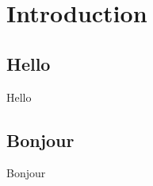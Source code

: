 \chapter{Introduction}\label{Chap1}
\minitoc

\section{Hello}\label{sec:hello}
Hello

\section{Bonjour}\label{sec:Bonjour}
Bonjour

